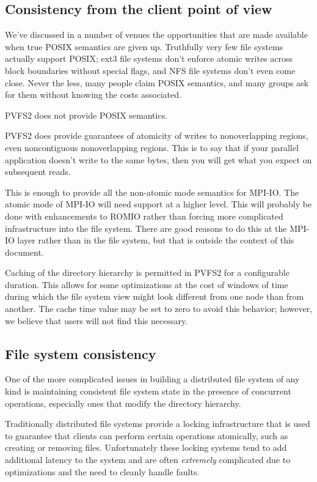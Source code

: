 \subsection{Consistency from the client point of view}

We've discussed in a number of venues the opportunities that are made
available when true POSIX semantics are given up.  Truthfully very few file
systems actually support POSIX; ext3 file systems don't enforce atomic writes
across block boundaries without special flags, and NFS file systems don't even
come close.  Never the less, many people claim POSIX semantics, and many
groups ask for them without knowing the costs associated.

PVFS2 does not provide POSIX semantics.

PVFS2 does provide guarantees of atomicity of writes to nonoverlapping
regions, even noncontiguous nonoverlapping regions.  This is to say that if
your parallel application doesn't write to the same bytes, then you will get
what you expect on subsequent reads.

This is enough to provide all the non-atomic mode semantics for MPI-IO.  The
atomic mode of MPI-IO will need support at a higher level.  This will probably
be done with enhancements to ROMIO rather than forcing more complicated
infrastructure into the file system.  There are good reasons to do this at the
MPI-IO layer rather than in the file system, but that is outside the context
of this document.

Caching of the directory hierarchy is permitted in PVFS2 for a configurable
duration.  This allows for some optimizations at the cost of windows of time
during which the file system view might look different from one node than from
another.  The cache time value may be set to zero to avoid this behavior;
however, we believe that users will not find this necessary.

\subsection{File system consistency}

One of the more complicated issues in building a distributed file system of
any kind is maintaining consistent file system state in the presence of
concurrent operations, especially ones that modify the directory hierarchy.

Traditionally distributed file systems provide a locking infrastructure that
is used to guarantee that clients can perform certain operations atomically,
such as creating or removing files.  Unfortunately these locking systems tend
to add additional latency to the system and are often \emph{extremely}
complicated due to optimizations and the need to cleanly handle faults.

